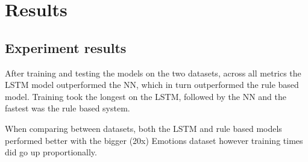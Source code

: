 \chapter{Results}
\section{Experiment results}
After training and testing the models on the two datasets, across all metrics
the LSTM model outperformed the NN, which in turn outperformed the rule based
model. Training took the longest on the LSTM, followed by the NN and the
fastest was the rule based system.

When comparing between datasets, both the LSTM and rule based models performed
better with the bigger (20x) Emotions dataset however training times did go up
proportionally.

